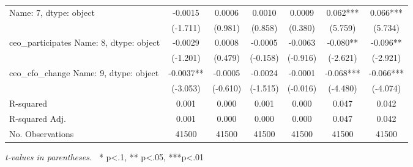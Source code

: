 \begin{table}[ht]
{{\begin{tabular}{lcccccc}
Name: 7, dtype: object & -0.0015 & 0.0006 & 0.0010 & 0.0009 & 0.062*** & 0.066*** \\
                            & (-1.711) & (0.981) & (0.858) & (0.380) & (5.759) & (5.734) \\
        ceo\_participates
Name: 8, dtype: object & -0.0029 & 0.0008 & -0.0005 & -0.0063 & -0.080** & -0.096** \\
                            & (-1.201) & (0.479) & (-0.158) & (-0.916) & (-2.621) & (-2.921) \\
        ceo\_cfo\_change
Name: 9, dtype: object & -0.0037** & -0.0005 & -0.0024 & -0.0001 & -0.068*** & -0.066*** \\
                            & (-3.053) & (-0.610) & (-1.515) & (-0.016) & (-4.480) & (-4.074) \\
\hline
R-squared & 0.001 & 0.000 & 0.001 & 0.000 & 0.047 & 0.042 \\
R-squared Adj. & 0.001 & 0.000 & 0.000 & 0.000 & 0.047 & 0.042 \\
No. Observations & 41500 & 41500 & 41500 & 41500 & 41500 & 41500 \\

    \hline
    \end{tabular}}
    }
    \bigskip
    \textit{t-values in parentheses.} \ 
    * p<.1, ** p<.05, ***p<.01
\end{table}
